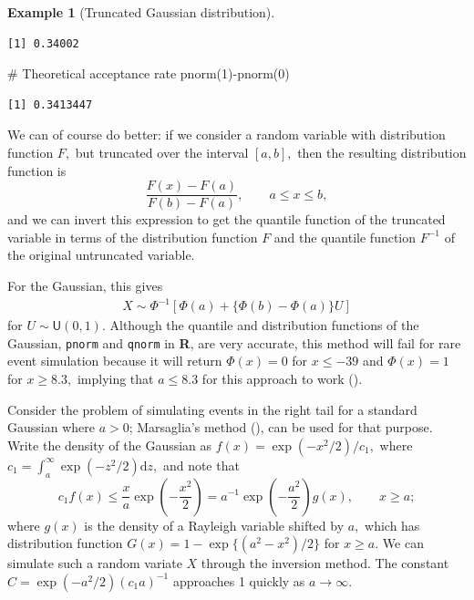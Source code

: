 \documentclass[
  11pt,
  letterpaper,
]{scrbook}
\newenvironment{Shaded}{\begin{snugshade}}{\end{snugshade}}
\newcommand{\CommentTok}[1]{\textcolor[rgb]{0.37,0.37,0.37}{#1}}
\newcommand{\DecValTok}[1]{\textcolor[rgb]{0.68,0.00,0.00}{#1}}
\newcommand{\FunctionTok}[1]{\textcolor[rgb]{0.28,0.35,0.67}{#1}}
\newcommand{\NormalTok}[1]{\textcolor[rgb]{0.00,0.23,0.31}{#1}}
\newcommand{\SpecialCharTok}[1]{\textcolor[rgb]{0.37,0.37,0.37}{#1}}
\theoremstyle{plain}
\theoremstyle{plain}
\theoremstyle{definition}
\theoremstyle{definition}
\theoremstyle{definition}
\newtheorem{example}{Example}[chapter]
\theoremstyle{plain}
\theoremstyle{remark}
\begin{document}
\begin{example}[Truncated Gaussian
distribution]
\begin{verbatim}
[1] 0.34002
\end{verbatim}

\begin{Shaded}
\begin{Highlighting}[]
\CommentTok{\# Theoretical acceptance rate}
\FunctionTok{pnorm}\NormalTok{(}\DecValTok{1}\NormalTok{)}\SpecialCharTok{{-}}\FunctionTok{pnorm}\NormalTok{(}\DecValTok{0}\NormalTok{)}
\end{Highlighting}
\end{Shaded}

\begin{verbatim}
[1] 0.3413447
\end{verbatim}

We can of course do better: if we consider a random variable with
distribution function \(F,\) but truncated over the interval \([a,b],\)
then the resulting distribution function is
\[\frac{F(x) - F(a)}{F(b)-F(a)}, \qquad a \leq x \leq b,\] and we can
invert this expression to get the quantile function of the truncated
variable in terms of the distribution function \(F\) and the quantile
function \(F^{-1}\) of the original untruncated variable.

For the Gaussian, this gives \begin{align*}
X \sim \Phi^{-1}\left[\Phi(a) + \{\Phi(b)-\Phi(a)\}U\right]
\end{align*} for \(U \sim \mathsf{U}(0,1).\) Although the quantile and
distribution functions of the Gaussian, \texttt{pnorm} and
\texttt{qnorm} in \textbf{R}, are very accurate, this method will fail
for rare event simulation because it will return \(\Phi(x) = 0\) for
\(x \leq -39\) and \(\Phi(x)=1\) for \(x \geq 8.3,\) implying that
\(a \leq 8.3\) for this approach to work
().

Consider the problem of simulating events in the right tail for a
standard Gaussian where \(a > 0\); Marsaglia's method
(), can be used for that
purpose. Write the density of the Gaussian as
\(f(x) = \exp(-x^2/2)/c_1,\) where
\(c_1 = \int_{a}^{\infty}\exp(-z^2/2)\mathrm{d} z,\) and note that
\[c_1f(x) \leq \frac{x}{a}\exp\left(-\frac{x^2}{2}\right)= a^{-1}\exp\left(-\frac{a^2}{2}\right)g(x), \qquad x \geq a;\]
where \(g(x)\) is the density of a Rayleigh variable shifted by \(a,\)
which has distribution function \(G(x) = 1-\exp\{(a^2-x^2)/2\}\) for
\(x \geq a.\) We can simulate such a random variate \(X\) through the
inversion method. The constant \(C= \exp(-a^2/2)(c_1a)^{-1}\) approaches
1 quickly as \(a \to \infty.\)


\end{example}
\end{document}
